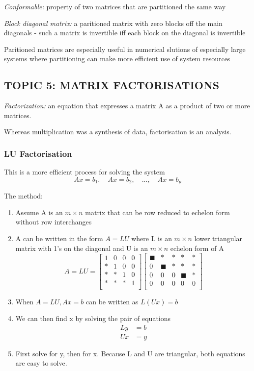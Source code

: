 \documentclass[12pt]{article} %
\begin{document}
\emph{Conformable:} property of two matrices that are partitioned the same way

\emph{Block diagonal matrix:} a paritioned matrix with zero blocks off the main diagonals 
\quad - such a matrix is invertible iff each block on the diagonal is invertible

Paritioned matrices are especially useful in numerical slutions of especially large systems where partitioning can make more efficient use of system resources


\subsection{TOPIC 5: MATRIX FACTORISATIONS}
\emph{Factorization:} an equation that expresses a matrix A as a product of two or more matrices. 

Whereas multiplication was a synthesis of data, factorisation is an analysis.

\subsubsection{LU Factorisation}
This is a more efficient process for solving the system
$$Ax = b_1, \quad Ax= b_2, \quad ..., \quad Ax = b_p$$

The method:
\begin{enumerate}
	\item Assume A is an $m \times n$ matrix that can be row reduced to echelon form without row interchanges
	\item A can be written in the form $A = LU$ where L is an $m \times n$ lower triangular matrix with 1's on the diagonal and U is an $m \times n$ echelon form of A
	$$A = LU = \begin{bmatrix}
		1 & 0 & 0 & 0\\
		* & 1 & 0 & 0\\
		* & * & 1 & 0\\
		* & * & * & 1\\
	\end{bmatrix} \begin{bmatrix}
		\blacksquare & * & * & * & *\\
		0 & \blacksquare & * & * & *\\
		0 & 0 & 0 & \blacksquare & *\\
		0 & 0 & 0 & 0 & 0\\
	\end{bmatrix}$$
	\item When $A = LU, Ax = b$ can be written as $L(Ux) = b$
	\item We can then find x by solving the pair of equations
		\begin{align*}
			Ly &= b\\
			Ux &= y
		\end{align*}
	\item First solve for y, then for x. Because L and U are triangular, both equations are easy to solve. 
\end{enumerate}
\end{document}
